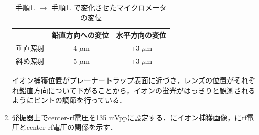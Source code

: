 \begin{enumerate}
\begin{table}[h]
\begin{center}
	\caption{手順1. $\rightarrow$ 手順1. で変化させたマイクロメータの変位}
	\label{tab:2_2D}
	\begin{tabular}{c|cc} \hline \hline
		&鉛直方向への変位&水平方向の変位 \\ \hline
		垂直照射&-4 $\mu$m & +3 $\mu$m \\ 
		斜め照射&-5 $\mu$m & +3 $\mu$m \\ \hline
	\end{tabular}
\end{center}
\end{table}

イオン捕獲位置がプレーナートラップ表面に近づき，レンズの位置がそれぞれ鉛直方向について下がることから，イオンの蛍光がはっきりと観測されるようにピントの調節を行っている．
\item 発振器上でcenter-rf電圧を135 mVppに設定する．にイオン捕獲画像，にrf電圧とcenter-rf電圧の関係を示す．


\end{enumerate}
